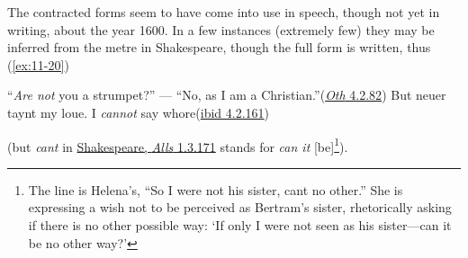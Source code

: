 The contracted forms seem to have come into use in speech, though not yet in writing, about the year 1600. In a few instances (extremely few) they may be inferred from the metre in Shakespeare, though the full form is written, thus (\ref{ex:11-20}) 

\ea \label{ex:11-20}
\ea
``\emph{Are not} you a strumpet?'' --- ``No, as I am a Christian.''\hfill(\href{https://internetshakespeare.uvic.ca/doc/Oth_F1/scene/4.2/index.html#tln-2775}{\textit{Oth} 4.2.82}) %
\ex \label{ex:WS11-1}
But neuer taynt my loue. I \emph{cannot} say whore\hfill(\href{https://internetshakespeare.uvic.ca/doc/Oth_F1/scene/4.2/index.html#tln-2875}{ibid 4.2.161}) %
\z
\z

\noindent (but \textit{cant} in \href{https://internetshakespeare.uvic.ca/doc/AWW_F1/scene/1.3/index.html#tln-490}{Shakespeare, \textit{Alls} 1.3.171} %
stands for \textit{can it} [be]\footnote{The line is Helena's, ``So I were not his sister, cant no other.'' She is expressing a wish not to be perceived as Bertram's sister, rhetorically asking if there is no other possible way: `If only I were not seen as his sister---can it be no other way?' \eds}). %

